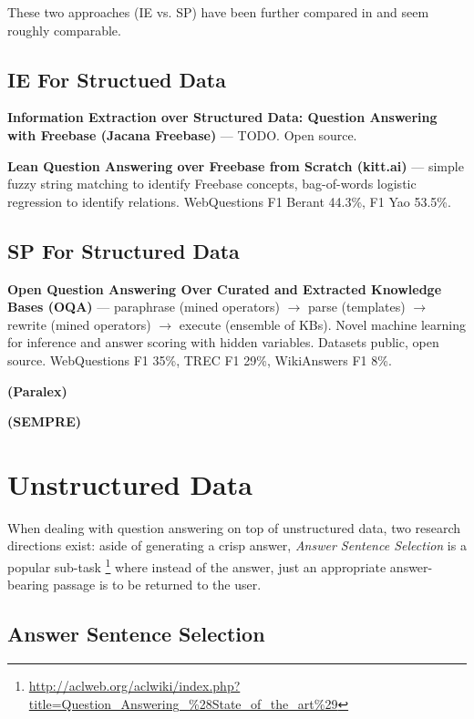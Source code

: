 \documentclass[11pt,a4paper]{article}
\begin{document}
These two approaches (IE vs. SP) have been further compared in \cite{FreebaseQA2014Yao}
and seem roughly comparable.

\subsection{IE For Structued Data}

\textbf{Information Extraction over Structured Data: Question Answering with Freebase (Jacana Freebase)} \cite{TreeFreebase2014Yao}
	--- TODO.
		Open source.

\textbf{Lean Question Answering over Freebase from Scratch (kitt.ai)} \cite{LeanFreebaseYao}
	--- simple fuzzy string matching to identify Freebase concepts,
		bag-of-words logistic regression to identify relations.
		WebQuestions F1 Berant 44.3\%, F1 Yao 53.5\%.

\subsection{SP For Structured Data}

\textbf{Open Question Answering Over Curated and Extracted Knowledge Bases (OQA)} \cite{OQA}
	--- paraphrase (mined operators) $\to$ parse (templates) $\to$ rewrite (mined operators) $\to$ execute (ensemble of KBs).
	Novel machine learning for inference and answer scoring with hidden variables.
	Datasets public, open source.
	WebQuestions F1 35\%, TREC F1 29\%, WikiAnswers F1 8\%.

\textbf{(Paralex)} \cite{Fader2013Paraphrase}

\textbf{(SEMPRE)} \cite{SPBerant2014Paraphrase}

\section{Unstructured Data}

When dealing with question answering on top of unstructured data,
two research directions exist: aside of generating a crisp answer,
\textit{Answer Sentence Selection} is a popular sub-task%
\footnote{\url{http://aclweb.org/aclwiki/index.php?title=Question_Answering_\%28State_of_the_art\%29}}
where instead of the answer, just an appropriate answer-bearing passage
is to be returned to the user.

\subsection{Answer Sentence Selection}
\end{document}
